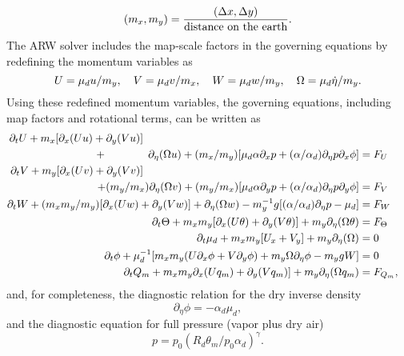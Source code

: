 \begin{equation}
(m_x,m_y) = {(\Delta x, \Delta y) \over \hbox{distance on the earth}}.
\end{equation}
%
\noindent
The ARW solver includes the map-scale factors in the governing equations
by redefining the momentum variables as
%
\begin{equation}
U = {\mu}_d u/m_y,~~~V = {\mu}_d v/m_x, ~~~W = \mu_d w / m_y, 
~~~\Omega = \mu_d \dot\eta /m_y.
\notag
\end{equation}
%
\noindent
Using these redefined momentum variables, 
the governing equations, including map factors and rotational terms, 
can be written as
%
\begin{align}
\partial_t U + m_x[\partial_x(Uu) + \partial_y(Vu)] \hphantom{\quad\quad\quad\quad\quad\quad\quad\quad\quad\quad\quad\quad\quad\quad\quad\quad\quad\quad\quad\quad}
\notag \\ 
+ \hphantom{(m_y/m_x)} 
\partial_\eta (\Omega u)
+ (m_x/m_y)[\mu_d \alpha \partial_x p
+ (\alpha/\alpha_d) \partial_\eta p \partial_x \phi] & = F_U
\label{u-mom-full}
\\
%
\partial_t V + m_y[\partial_x (Uv) + \partial_y (Vv)] \hphantom{\quad\quad\quad\quad\quad\quad\quad\quad\quad\quad\quad\quad\quad\quad\quad\quad\quad\quad\quad\quad}
\notag \\ + (m_y/m_x)\partial_\eta (\Omega v)
+ (m_y/m_x)[\mu_d \alpha \partial_y p
+ (\alpha/\alpha_d) \partial_\eta p \partial_y \phi] & = F_V
\label{v-mom-full}
\\
%
\partial_t W + (m_x m_y/m_y) [\partial_x (Uw) + \partial_y (Vw)] + \partial_\eta (\Omega w)
- m_y^{-1} g [ (\alpha/\alpha_d) \partial_\eta p - \mu_d ] & = F_W 
\label{w-mom-full}
\\
%
\partial_t \Theta + 
m_x m_y[\partial_x (U\theta) + \partial_y (V\theta)] + m_y \partial_\eta (\Omega \theta)
& = F_\Theta \\
%
\partial_t \mu_d + m_x m_y[U_x + V_y] + m_y \partial_\eta (\Omega)
& = 0 
\label{mass-cons-full}
\\
%
\partial_t \phi + \mu_d^{-1} [m_x m_y (U\partial_x\phi + V\partial_y\phi) + m_y
\Omega\partial_\eta\phi - m_y gW ] & = 0
\label{geo-full}
\\
%
\partial_t Q_m + 
m_x m_y \partial_x (U q_m) + \partial_y (V q_m)] + m _y\partial_\eta (\Omega q_m)
& = F_{Q_m},
%
\end{align}
\noindent
and, for completeness, 
the diagnostic relation for the dry inverse density
%
\begin{equation}
\partial_\eta \phi  = - \alpha_d \mu_d,
\label{hydro-full}
\end{equation}
%
\noindent
and the diagnostic equation for full pressure (vapor plus dry air)
%
\begin{equation}
p = p_0 (R_d \theta_m / p_0 \alpha_d)^{\gamma}.
\label{moist-state-equation}
\end{equation}
%

